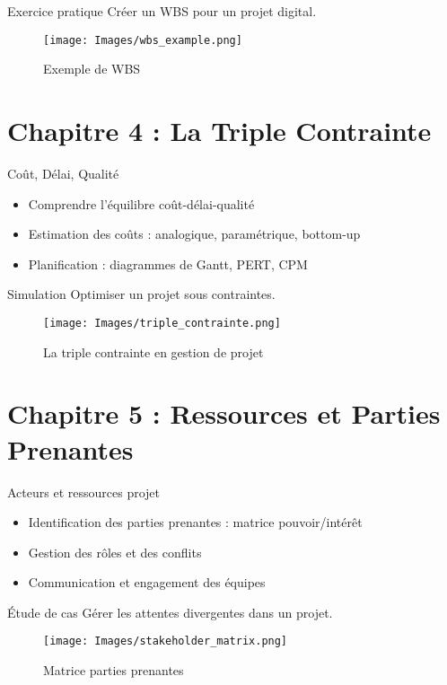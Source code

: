 \documentclass[11pt]{beamer}
\begin{document}
\begin{frame}{Exercice pratique}
  \pause
  Créer un WBS pour un projet digital.
  \begin{figure}\centering
    \texttt{[image: Images/wbs\_example.png]}
    \caption{Exemple de WBS}
  \end{figure}
\end{frame}

\section{Chapitre 4 : La Triple Contrainte}
\begin{frame}{Coût, Délai, Qualité}
  \pause
  \begin{itemize}
    \item Comprendre l’équilibre coût-délai-qualité \pause
    \item Estimation des coûts : analogique, paramétrique, bottom-up \pause
    \item Planification : diagrammes de Gantt, PERT, CPM
  \end{itemize}
\end{frame}

\begin{frame}{Simulation}
  \pause
  Optimiser un projet sous contraintes.\pause
  \begin{figure}\centering
    \texttt{[image: Images/triple\_contrainte.png]}
    \caption{La triple contrainte en gestion de projet}
  \end{figure}
\end{frame}

\section{Chapitre 5 : Ressources et Parties Prenantes}
\begin{frame}{Acteurs et ressources projet}
  \pause
  \begin{itemize}
    \item Identification des parties prenantes : matrice pouvoir/intérêt \pause
    \item Gestion des rôles et des conflits \pause
    \item Communication et engagement des équipes
  \end{itemize}
\end{frame}

\begin{frame}{Étude de cas}
  \pause
  Gérer les attentes divergentes dans un projet.\pause
  \begin{figure}\centering
    \texttt{[image: Images/stakeholder\_matrix.png]}
    \caption{Matrice parties prenantes}
  \end{figure}
\end{frame}
\end{document}
